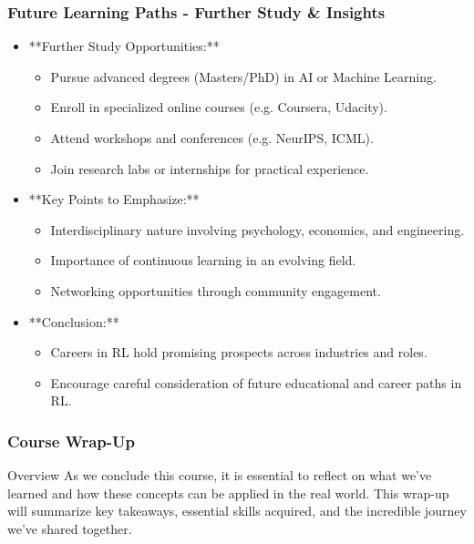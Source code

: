\documentclass[aspectratio=169]{beamer}
\begin{document}
\begin{frame}[fragile]
    \frametitle{Future Learning Paths - Further Study & Insights}
    \begin{itemize}
        \item **Further Study Opportunities:**
        \begin{itemize}
            \item Pursue advanced degrees (Masters/PhD) in AI or Machine Learning.
            \item Enroll in specialized online courses (e.g. Coursera, Udacity).
            \item Attend workshops and conferences (e.g. NeurIPS, ICML).
            \item Join research labs or internships for practical experience.
        \end{itemize}
        \item **Key Points to Emphasize:**
        \begin{itemize}
            \item Interdisciplinary nature involving psychology, economics, and engineering.
            \item Importance of continuous learning in an evolving field.
            \item Networking opportunities through community engagement.
        \end{itemize}
        \item **Conclusion:**
            \begin{itemize}
                \item Careers in RL hold promising prospects across industries and roles.
                \item Encourage careful consideration of future educational and career paths in RL.
            \end{itemize}
    \end{itemize}
\end{frame}

\begin{frame}
    \frametitle{Course Wrap-Up}
    \begin{block}{Overview}
        As we conclude this course, it is essential to reflect on what we've learned and how these concepts can be applied in the real world. This wrap-up will summarize key takeaways, essential skills acquired, and the incredible journey we've shared together.
    \end{block}
\end{frame}
\end{document}
